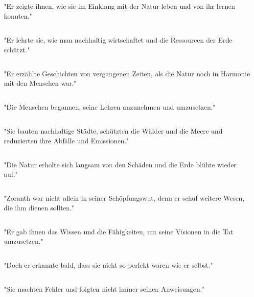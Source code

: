 \documentclass{article}
\begin{document}
\subsection{}
"Er zeigte ihnen, wie sie im Einklang mit der Natur leben und von ihr lernen konnten."
\subsection{}
"Er lehrte sie, wie man nachhaltig wirtschaftet und die Ressourcen der Erde schützt."
\subsection{}
"Er erzählte Geschichten von vergangenen Zeiten, als die Natur noch in Harmonie mit den Menschen war."
\subsection{}
"Die Menschen begannen, seine Lehren anzunehmen und umzusetzen."
\subsection{}
"Sie bauten nachhaltige Städte, schützten die Wälder und die Meere und reduzierten ihre Abfälle und Emissionen."
\subsection{}
"Die Natur erholte sich langsam von den Schäden und die Erde blühte wieder auf."
\subsection{}
"Zoranth war nicht allein in seiner Schöpfungswut, denn er schuf weitere Wesen, die ihm dienen sollten."
\subsection{}
"Er gab ihnen das Wissen und die Fähigkeiten, um seine Visionen in die Tat umzusetzen."
\subsection{}
"Doch er erkannte bald, dass sie nicht so perfekt waren wie er selbst."
\subsection{}
"Sie machten Fehler und folgten nicht immer seinen Anweisungen."
\end{document}
